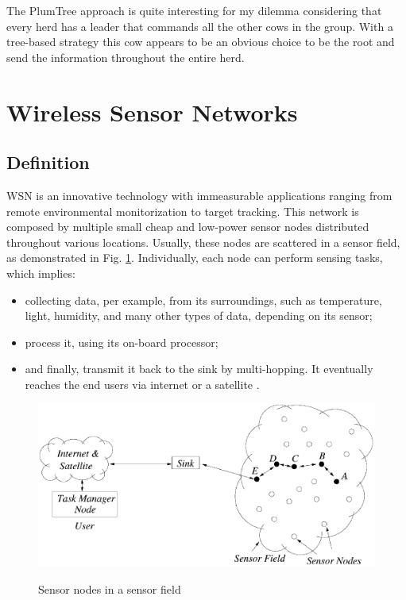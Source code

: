 The PlumTree approach is quite interesting for my dilemma considering that every herd has a
leader that commands all the other cows in the group. With a tree-based strategy this cow
appears to be an obvious choice to be the root and send the information throughout the
entire herd.


\section{Wireless Sensor Networks}
\label{sec:wireless_sensor_networks}

\subsection{Definition}
\label{subsec:wsn_definition}
\Gls{WSN} is an innovative technology with immeasurable applications ranging from remote
environmental monitorization to target tracking. This network is composed by multiple small
cheap and low-power sensor nodes distributed throughout various locations. Usually, these nodes
are scattered in a sensor field, as demonstrated in Fig. \ref{fig:sensor_nodes_in_sensor_fields}.
Individually, each node can perform sensing tasks, which implies:
\begin{itemize}
    \item collecting data, per example, from its surroundings, such as temperature, light,
          humidity, and many other types of data, depending on its sensor;
    \item process it, using its on-board processor;
    \item and finally, transmit it back to the sink by multi-hopping. It eventually reaches
          the end users via internet or a satellite \cite{Akyildiz2002}.
\end{itemize}

\begin{figure}[h]
    \caption{Sensor nodes in a sensor field \cite{Akyildiz2002}}
    \centering
    \includegraphics[scale=0.5]{Chapters/Figures/sensor_nodes_in_sensor_fields.png}
    \label{fig:sensor_nodes_in_sensor_fields}
\end{figure}

